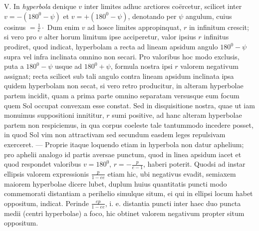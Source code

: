 V. In \emph{hyperbola} denique $v$ inter limites adhuc arctiores coërcetur, scilicet inter $v = -(180^0-\psi)$ et $v = +(180^0-\psi)$, denotando per $\psi$ angulum, cuius cosinus $= \frac{1}{e}\cdot$ Dum enim $v$ ad hosce limites appropinquat, $r$ in infinitum crescit; si vero pro $v$ alter horum limitum ipse acciperetur, valor ipsius $r$ infinitus prodiret, quod indicat, hyperbolam a recta ad lineam apsidum angulo $180^0-\psi$ supra vel infra inclinata omnino non secari. Pro valoribus hoc modo exclusis, puta a $180^0-\psi$ usque ad $180^0+\psi$, formula nostra ipsi $r$ valorem negativum assignat; recta scilicet sub tali angulo contra lineam apsidum inclinata ipsa quidem hyperbolam non secat, si vero retro producitur, in alteram hyperbolae partem incidit, quam a prima parte omnino separatam versusque eum focum quem Sol occupat convexam esse constat. Sed in disquisitione nostra, quae ut iam monuimus suppositioni innititur, $r$ sumi positive, ad hanc alteram hyperbolae partem non respiciemus, in qua corpus coeleste tale tantummodo incedere posset, in quod Sol vim non attractivam sed secundum easdem leges repulsivam exerceret. — Proprie itaque loquendo etiam in hyperbola non datur aphelium; pro aphelii analogo id partis aversae punctum, quod in linea apsidum iacet et quod respondet valoribus $v = 180^0$, $r = -\frac{p}{e-1}$, haberi poterit. Quodsi ad instar ellipsis valorem expressionis $\frac{p}{1-ee}$ etiam hic, ubi negativus evadit, semiaxem maiorem hyperbolae dicere lubet, duplum huius quantitatis puncti modo commemorati distantiam a perihelio simulque situm, ei qui in ellipsi locum habet oppositum, indicat. Perinde $\frac{ep}{1-ee}$, i. e. distantia puncti inter haec duo puncta medii (centri hyperbolae) a foco, hic obtinet valorem negativum propter situm oppositum.
